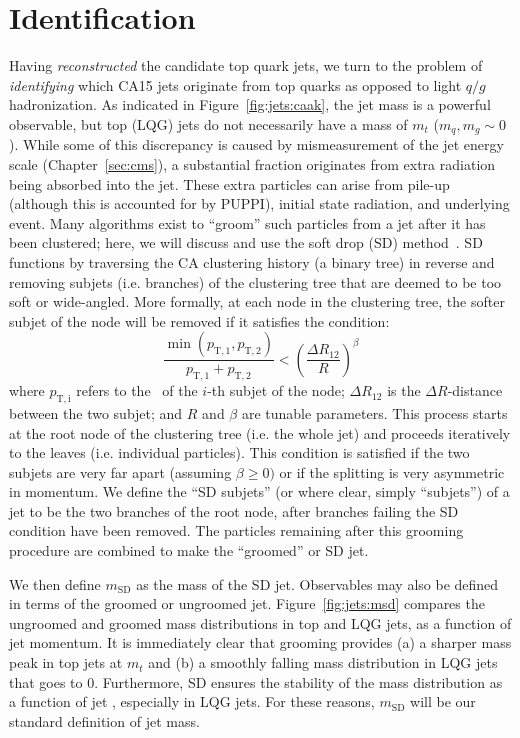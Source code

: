 \section{Identification}
\label{sec:jets:id}

Having \emph{reconstructed} the candidate top quark jets, we turn to the problem of \emph{identifying} which CA15 jets originate from top quarks as opposed to light $q/g$ hadronization. 
As indicated in Figure~\ref{fig:jets:caak}, the jet mass is a powerful observable, but top (LQG) jets do not necessarily have a mass of $m_t$ ($m_q,m_g\sim 0$). 
While some of this discrepancy is caused by mismeasurement of the jet energy scale (Chapter~\ref{sec:cms}), a substantial fraction originates from extra radiation being absorbed into the jet.
These extra particles can arise from pile-up (although this is accounted for by PUPPI), initial state radiation, and underlying event.
Many algorithms exist to ``groom'' such particles from a jet after it has been clustered; here, we will discuss and use the soft drop (SD) method~\needcite.
SD functions by traversing the CA clustering history (a binary tree) in reverse and removing subjets (i.e. branches) of the clustering tree that are deemed to be too soft or wide-angled.
More formally, at each node in the clustering tree, the softer subjet of the node will be removed if it satisfies the condition:
\begin{equation}
    \frac{\min(p_\mathrm{T,1},p_\mathrm{T,2})}{p_\mathrm{T,1}+p_\mathrm{T,2}} < 
    \left(\frac{\Delta R_{12}}{R}\right)^\beta
\end{equation}
where $p_\mathrm{T,i}$ refers to the \pt~of the $i$-th subjet of the node; $\Delta R_{12}$ is the $\Delta R$-distance between the two subjet; and $R$ and $\beta$ are tunable parameters. 
This process starts at the root node of the clustering tree (i.e. the whole jet) and proceeds iteratively to the leaves (i.e. individual particles).
This condition is satisfied if the two subjets are very far apart (assuming $\beta \geq 0)$ or if the splitting is very asymmetric in momentum. 
We define the ``SD subjets'' (or where clear, simply ``subjets'') of a jet to be the two branches of the root node, after branches failing the SD condition have been removed. 
The particles remaining after this grooming procedure are combined to make the ``groomed'' or SD jet. 

We then define $m_\mathrm{SD}$ as the mass of the SD jet. 
Observables may also be defined in terms of the groomed or ungroomed jet. 
Figure~\ref{fig:jets:msd} compares the ungroomed and groomed mass distributions in top and LQG jets, as a function of jet momentum. 
It is immediately clear that grooming provides (a) a sharper mass peak in top jets at $m_t$ and (b) a smoothly falling mass distribution in LQG jets that goes to 0.
Furthermore, SD ensures the stability of the mass distribution as a function of jet \pt, especially in LQG jets.
For these reasons, $m_\mathrm{SD}$ will be our standard definition of jet mass. 


